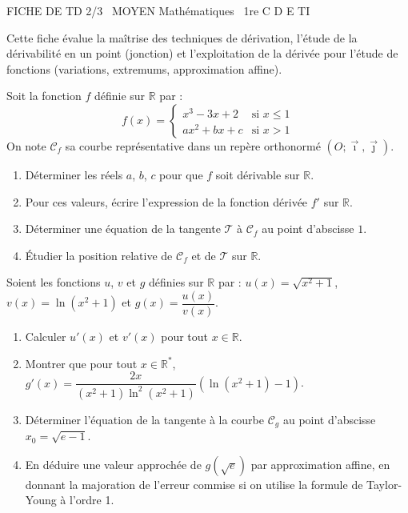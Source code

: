 \documentclass[11pt]{article}
\begin{document}
\begin{tcolorbox}[enhanced,colback=popink,colframe=popink,arc=10pt,boxrule=0pt,left=12pt,right=12pt,top=9pt,bottom=9pt]
{\color{white}\popxbold\small FICHE DE TD 2/3 \textbullet\ MOYEN \hfill Mathématiques \textbullet\ 1re C D E TI\par}
\end{tcolorbox}
\vspace{4pt}
Cette fiche évalue la maîtrise des techniques de dérivation, l'étude de la dérivabilité en un point (jonction) et l'exploitation de la dérivée pour l'étude de fonctions (variations, extremums, approximation affine).

\begin{exercice}
Soit la fonction $f$ définie sur $\mathbb{R}$ par :
\[
f(x) = \begin{cases}
x^3 - 3x + 2 & \text{si } x \leqslant 1 \\
ax^2 + bx + c & \text{si } x > 1
\end{cases}
\]
On note $\mathcal{C}_f$ sa courbe représentative dans un repère orthonormé $(O;\vec{\imath},\vec{\jmath})$.
\begin{enumerate}
    \item Déterminer les réels $a$, $b$, $c$ pour que $f$ soit dérivable sur $\mathbb{R}$.
    \item Pour ces valeurs, écrire l'expression de la fonction dérivée $f'$ sur $\mathbb{R}$.
    \item Déterminer une équation de la tangente $\mathcal{T}$ à $\mathcal{C}_f$ au point d'abscisse $1$.
    \item Étudier la position relative de $\mathcal{C}_f$ et de $\mathcal{T}$ sur $\mathbb{R}$.
\end{enumerate}
\end{exercice}

\begin{exercice}
Soient les fonctions $u$, $v$ et $g$ définies sur $\mathbb{R}$ par :
$u(x) = \sqrt{x^2+1}$, $v(x) = \ln(x^2+1)$ et $g(x) = \dfrac{u(x)}{v(x)}$.
\begin{enumerate}
    \item Calculer $u'(x)$ et $v'(x)$ pour tout $x \in \mathbb{R}$.
    \item Montrer que pour tout $x \in \mathbb{R}^*$, $g'(x) = \dfrac{2x}{(x^2+1)\ln^2(x^2+1)}\left(\ln(x^2+1) - 1\right)$.
    \item Déterminer l'équation de la tangente à la courbe $\mathcal{C}_g$ au point d'abscisse $x_0 = \sqrt{e-1}$.
    \item En déduire une valeur approchée de $g(\sqrt{e})$ par approximation affine, en donnant la majoration de l'erreur commise si on utilise la formule de Taylor-Young à l'ordre 1.
\end{enumerate}
\end{exercice}
\end{document}
